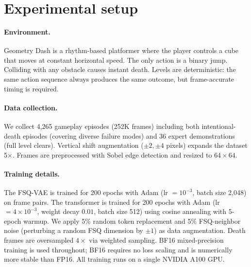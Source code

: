 \documentclass{article}
\newcommand{\imgsize}{64 \times 64}
\begin{document}
\section{Experimental setup}
\label{sec:setup}

\paragraph{Environment.}
Geometry Dash is a rhythm-based platformer where the player controls a cube that moves at constant horizontal speed.
The only action is a binary jump.
Colliding with any obstacle causes instant death.
Levels are deterministic: the same action sequence always produces the same outcome, but frame-accurate timing is required.

\paragraph{Data collection.}
We collect 4,265 gameplay episodes (252K frames) including both intentional-death episodes (covering diverse failure modes) and 36 expert demonstrations (full level clears).
Vertical shift augmentation ($\pm 2, \pm 4$ pixels) expands the dataset 5$\times$.
Frames are preprocessed with Sobel edge detection and resized to $\imgsize$.

\paragraph{Training details.}
The FSQ-VAE is trained for 200 epochs with Adam (lr $= 10^{-3}$, batch size 2,048) on frame pairs.
The transformer is trained for 200 epochs with Adam (lr $= 4 \times 10^{-3}$, weight decay $0.01$, batch size 512) using cosine annealing with 5-epoch warmup.
We apply 5\% random token replacement and 5\% FSQ-neighbor noise (perturbing a random FSQ dimension by $\pm 1$) as data augmentation.
Death frames are oversampled $4\times$ via weighted sampling.
BF16 mixed-precision training is used throughout; BF16 requires no loss scaling and is numerically more stable than FP16.
All training runs on a single NVIDIA A100 GPU.
\end{document}
